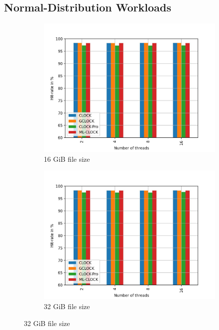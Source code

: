 \documentclass[
	12pt,
	a4paper,
	abstract,
	bibliography=totoc,
	chapterprefix,
	headings=openright,
	numbers=endperiod,
	parskip=half,
	twoside,
]{scrreprt}
\begin{document}
\subsection{Normal-Distribution Workloads}
\begin{figure}[H]
	\centering
	\begin{subfigure}{0.4\textwidth}
		\includegraphics[width=\textwidth]{multi_16_gb_randread_normal.jpg}		
		\caption{16 GiB file size}
		\label{fig:rw_90to10  zipf}
	\end{subfigure}
	\hfill
	\begin{subfigure}{0.4\textwidth}
		\includegraphics[width=\textwidth]{multi_32_gb_randread_normal.jpg}		
		\caption{32 GiB file size}
		\label{fig:rw_90to10  normal}

\end{subfigure}
\end{figure}
\end{document}
